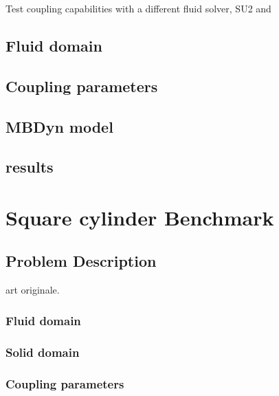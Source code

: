 Test coupling capabilities with a different fluid solver, SU2 and 


\subsection{Fluid domain}


\subsection{Coupling parameters}


\subsection{MBDyn model}

\subsection{results}




















\section{Square cylinder Benchmark}

\subsection{Problem Description}

\cite{ramm1998fluid} art originale.


\subsubsection{Fluid domain}


\subsubsection{Solid domain}


\subsubsection{Coupling parameters}


